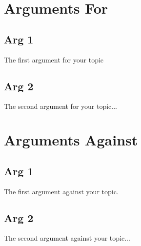 \documentclass[11pt]{article}
\begin{document}
\section{Arguments For}
\subsection{Arg 1}
The first argument for your topic
\subsection{Arg 2}
The second argument for your topic...
\section{Arguments Against}
\subsection{Arg 1}
The first argument against your topic.
\subsection{Arg 2}
The second argument against your topic...

\end{document}
